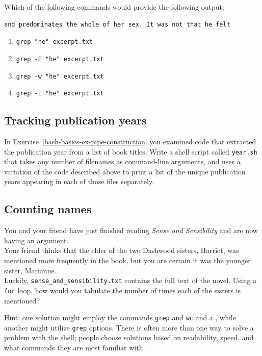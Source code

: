 \documentclass[
]{krantz}
\providecommand{\tightlist}{%
  \setlength{\itemsep}{0pt}\setlength{\parskip}{0pt}}
\begin{document}
Which of the following commands would provide the following output:

\begin{verbatim}
and predominates the whole of her sex. It was not that he felt
\end{verbatim}

\begin{enumerate}
\def\labelenumi{\arabic{enumi}.}
\tightlist
\item
  \texttt{grep\ "he"\ excerpt.txt}
\item
  \texttt{grep\ -E\ "he"\ excerpt.txt}
\item
  \texttt{grep\ -w\ "he"\ excerpt.txt}
\item
  \texttt{grep\ -i\ "he"\ excerpt.txt}
\end{enumerate}

\hypertarget{bash-advanced-ex-year-script}{%
\subsection{Tracking publication years}\label{bash-advanced-ex-year-script}}

In Exercise~\ref{bash-basics-ex-pipe-construction}
you examined code that extracted the publication year from a list of book titles.
Write a shell script called \texttt{year.sh} that takes any number of
filenames as command-line arguments,
and uses a variation of the code described above to print a list
of the unique publication years appearing in each of those files separately.

\hypertarget{bash-advanced-ex-sense-sensibility}{%
\subsection{Counting names}\label{bash-advanced-ex-sense-sensibility}}

You and your friend have just finished reading \emph{Sense and Sensibility}
and are now having an argument.\\
Your friend thinks that the elder of the two Dashwood sisters,
Harriet,
was mentioned more frequently in the book,
but you are certain it was the younger sister, Marianne.\\
Luckily, \texttt{sense\_and\_sensibility.txt} contains the full text of the novel.
Using a \texttt{for} loop,
how would you tabulate the number of times each of the sisters is mentioned?

Hint: one solution might employ
the commands \texttt{grep} and \texttt{wc} and a \texttt{\textbar{}},
while another might utilize \texttt{grep} options.
There is often more than one way to solve a problem with the shell;
people choose solutions based on readability,
speed,
and what commands they are most familiar with.
\end{document}
